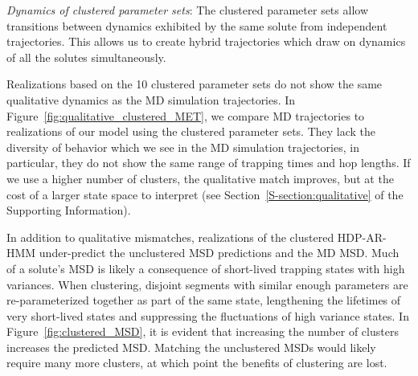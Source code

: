 \documentclass[journal=jpcbfk,manuscript=article]{achemso}
\begin{document}
  \textit{Dynamics of clustered parameter sets}: The clustered
  parameter sets allow transitions between dynamics exhibited by the
  same solute from independent trajectories. This allows us to create
  hybrid trajectories which draw on dynamics of all the solutes
  simultaneously.
  
  Realizations based on the 10 clustered parameter sets do not show the same
  qualitative dynamics as the MD simulation trajectories. In 
  Figure~\ref{fig:qualitative_clustered_MET}, we compare MD trajectories to 
  realizations of our model using the clustered parameter sets. They lack the
  diversity of behavior which we see in the MD simulation trajectories, in particular, 
  they do not show the same range of trapping times and hop lengths. If we use
  a higher number of clusters, the qualitative match improves, but at the cost
  of a larger state space to interpret (see Section~\ref{S-section:qualitative}
  of the Supporting Information).
  
  In addition to qualitative mismatches, realizations of the clustered HDP-AR-HMM 
  under-predict the unclustered MSD predictions and the MD MSD. Much of a solute's 
  MSD is likely a consequence of short-lived trapping states with high variances.
  When clustering, disjoint segments with similar enough parameters are re-parameterized
  together as part of the same state, lengthening the lifetimes of very short-lived 
  states and suppressing the fluctuations of high variance states. In 
  Figure~\ref{fig:clustered_MSD}, it is evident that increasing the number of clusters
  increases the predicted MSD. Matching the unclustered MSDs would likely require many
  more clusters, at which point the benefits of clustering are lost. 
  
\end{document}
